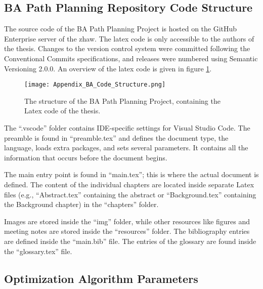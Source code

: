 \subsection{BA Path Planning Repository \newline Code Structure} \label{sec:Appendix BA Code Structure}
The source code of the BA Path Planning Project is hosted on the GitHub Enterprise server of the \acrshort{zhaw}. \cite{ros_path_planning_github}
The \Gls{latex} code is only accessible to the authors of the thesis. Changes to the version control system were committed following the Conventional Commits specifications, and releases were numbered using Semantic Versioning 2.0.0. \cite{conventional_commits} \cite{semantic_versioning}
An overview of the \Gls{latex} code is given in figure \ref{fig:Appendix BA Code Structure}.
\begin{figure}[H]
    \centering
    \texttt{[image: Appendix\_BA\_Code\_Structure.png]}
    \caption{The structure of the BA Path Planning Project, containing the Latex code of the thesis.}
    \label{fig:Appendix BA Code Structure}
\end{figure}

\pagebreak

The ``.vscode'' folder contains IDE-specific settings for Visual Studio Code. \cite{vscode_user_and_workspace_settings}
The preamble is found in ``preamble.tex'' and defines the document type, the language, loads extra packages, and sets several parameters. It contains all the information that occurs before the document begins.

The main entry point is found in ``main.tex''; this is where the actual document is defined. The content of the individual chapters are located inside separate Latex files (e.g., ``Abstract.tex'' containing the abstract or ``Background.tex'' containing the Background chapter) in the ``chapters'' folder.

Images are stored inside the ``img'' folder, while other resources like figures and meeting notes are stored inside the ``resources'' folder. The bibliography entries are defined inside the ``main.bib'' file. The entries of the glossary are found inside the ``glossary.tex'' file.

\pagebreak

\subsection{Optimization Algorithm Parameters} \label{sec:Appendix Optimization Algorithm Parameters}

